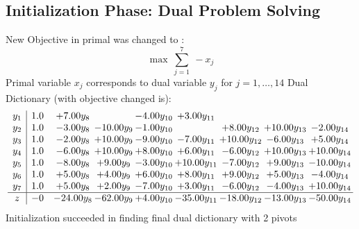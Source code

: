 \documentclass[8pt]{article}
\begin{document}
\subsection{Initialization Phase: Dual Problem Solving}
New Objective in primal was changed to : \[ \max\ \sum_{j=1}^{7}\ - x_j \] 
Primal variable $x_j$ corresponds to dual variable $y_j$ for $j = 1,\ldots,14$
Dual Dictionary (with objective changed is): 
\[\begin{array}{c| c c@{\hskip 2pt} c@{\hskip 2pt} c@{\hskip 2pt} c@{\hskip 2pt} c@{\hskip 2pt} c@{\hskip 2pt} c@{\hskip 2pt} }
 y_{1}   &  1.0 & +  7.00 y_{8} &   & -4.00 y_{10} & +  3.00 y_{11} &    &    &   \\
 y_{2}   &  1.0 & -3.00 y_{8} & -10.00 y_{9} & -1.00 y_{10} &   & +  8.00 y_{12} & + 10.00 y_{13} & -2.00 y_{14}\\
 y_{3}   &  1.0 & -2.00 y_{8} & + 10.00 y_{9} & -9.00 y_{10} & -7.00 y_{11} & + 10.00 y_{12} & -6.00 y_{13} & +  5.00 y_{14}\\
 y_{4}   &  1.0 & -6.00 y_{8} & + 10.00 y_{9} & +  8.00 y_{10} & +  6.00 y_{11} & -6.00 y_{12} & + 10.00 y_{13} & + 10.00 y_{14}\\
 y_{5}   &  1.0 & -8.00 y_{8} & +  9.00 y_{9} & -3.00 y_{10} & + 10.00 y_{11} & -7.00 y_{12} & +  9.00 y_{13} & -10.00 y_{14}\\
 y_{6}   &  1.0 & +  5.00 y_{8} & +  4.00 y_{9} & +  6.00 y_{10} & +  8.00 y_{11} & +  9.00 y_{12} & +  5.00 y_{13} & -4.00 y_{14}\\
 y_{7}   &  1.0 & +  5.00 y_{8} & +  2.00 y_{9} & -7.00 y_{10} & +  3.00 y_{11} & -6.00 y_{12} & -4.00 y_{13} & + 10.00 y_{14}\\
\hline
z    &  -0 & -24.00 y_{8} & -62.00 y_{9} & +  4.00 y_{10} & -35.00 y_{11} & -18.00 y_{12} & -13.00 y_{13} & -50.00 y_{14}\\
\end{array}\]
Initialization succeeded in finding final dual dictionary with 2 pivots
\end{document}
